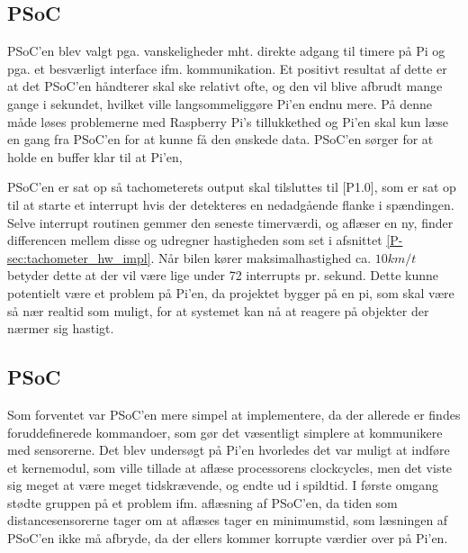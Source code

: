 \subsection{PSoC} \label{sec:swd_psoc_board}

PSoC'en blev valgt pga. vanskeligheder mht. direkte adgang til timere på Pi og pga. et besværligt interface ifm. \IIC kommunikation. Et positivt resultat af dette er at det PSoC'en håndterer skal ske relativt ofte, og den vil blive afbrudt mange gange i sekundet, hvilket ville langsommeliggøre Pi'en endnu mere. På denne måde løses problemerne med Raspberry Pi's tillukkethed og Pi'en skal kun læse en gang fra PSoC'en for at kunne få den ønskede data. PSoC'en sørger for at holde en buffer klar til at Pi'en,  


PSoC'en er sat op så tachometerets output skal tilsluttes til [P1.0], som er sat op til at starte et interrupt hvis der detekteres en nedadgående flanke i spændingen. Selve interrupt routinen gemmer den seneste timerværdi, og aflæser en ny, finder differencen mellem disse og udregner hastigheden som set i afsnittet \ref{P-sec:tachometer_hw_impl}. Når bilen kører maksimalhastighed ca. $10km/t$ betyder dette at der vil være lige under 72 interrupts pr. sekund. Dette kunne potentielt være et problem på Pi'en, da projektet bygger på en pi, som skal være så nær realtid som muligt, for at systemet kan nå at reagere på objekter der nærmer sig hastigt.


\subsection{PSoC} \label{sec:swi_psoc_board}

Som forventet var PSoC'en mere simpel at implementere, da der allerede er findes foruddefinerede \IIC kommandoer, som gør det væsentligt simplere at kommunikere med sensorerne. Det blev undersøgt på Pi'en hvorledes det var muligt at indføre et kernemodul, som ville tillade at aflæse processorens clockcycles, men det viste sig meget at være meget tidskrævende, og endte ud i spildtid. I første omgang stødte gruppen på et problem ifm. aflæsning af PSoC'en, da tiden som distancesensorerne tager om at aflæses tager en minimumstid, som læsningen af PSoC'en ikke må afbryde, da der ellers kommer korrupte værdier over på Pi'en. 

